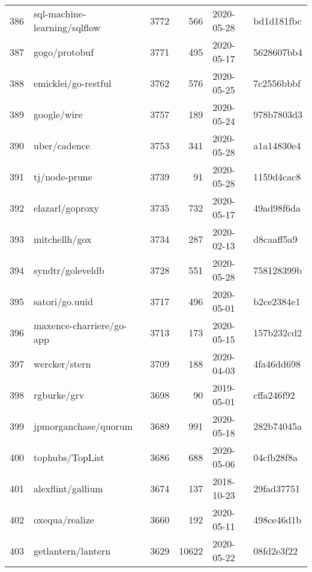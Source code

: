 \begin{longtable}{llrrll}
    386 &                       sql-machine-learning/sqlflow &   3772 &    566 & 2020-05-28 &  bd1d181fbc \\
    387 &                                      gogo/protobuf &   3771 &    495 & 2020-05-17 &  5628607bb4 \\
    388 &                                emicklei/go-restful &   3762 &    576 & 2020-05-25 &  7c2556bbbf \\
    389 &                                        google/wire &   3757 &    189 & 2020-05-24 &  978b7803d3 \\
    390 &                                       uber/cadence &   3753 &    341 & 2020-05-28 &  a1a14830e4 \\
    391 &                                      tj/node-prune &   3739 &     91 & 2020-05-28 &  1159d4cac8 \\
    392 &                                    elazarl/goproxy &   3735 &    732 & 2020-05-17 &  49ad98f6da \\
    393 &                                      mitchellh/gox &   3734 &    287 & 2020-02-13 &  d8caaff5a9 \\
    394 &                                   syndtr/goleveldb &   3728 &    551 & 2020-05-28 &  758128399b \\
    395 &                                     satori/go.uuid &   3717 &    496 & 2020-05-01 &  b2ce2384e1 \\
    396 &                           maxence-charriere/go-app &   3713 &    173 & 2020-05-15 &  157b232cd2 \\
    397 &                                      wercker/stern &   3709 &    188 & 2020-04-03 &  4fa46dd698 \\
    398 &                                        rgburke/grv &   3698 &     90 & 2019-05-01 &  cffa246f92 \\
    399 &                               jpmorganchase/quorum &   3689 &    991 & 2020-05-18 &  282b74045a \\
    400 &                                    tophubs/TopList &   3686 &    688 & 2020-05-06 &  04cfb28f8a \\
    401 &                                  alexflint/gallium &   3674 &    137 & 2018-10-23 &  29fad37751 \\
    402 &                                     oxequa/realize &   3660 &    192 & 2020-05-11 &  498ce46d1b \\
    403 &                                 getlantern/lantern &   3629 &  10622 & 2020-05-22 &  08fd2e3f22 \\

\end{longtable}
